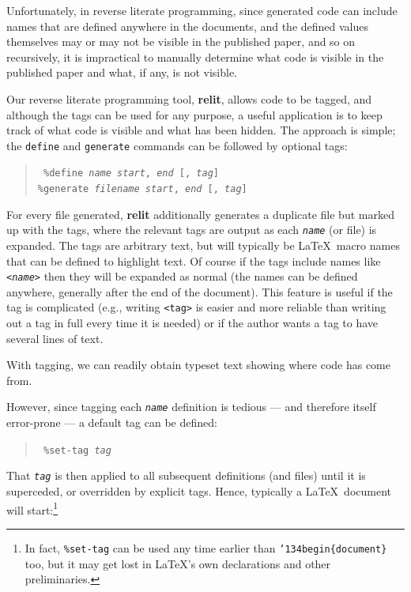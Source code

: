 \documentclass[12pt]{article}
\def\name#1{\textbf{#1}}
\begin{document}
Unfortunately, in reverse literate programming, since generated code can include names that are defined anywhere in the documents, and the defined values themselves may or may not be visible in the published paper, and so on recursively, it is impractical to manually determine what code is visible in the published paper and what, if any, is not visible.

Our reverse literate programming tool, \name{relit}, allows code to be tagged, and although the tags can be used for any purpose, a useful application is to keep track of what code is visible and what has been hidden. The approach is simple; the \texttt{define} and \texttt{generate} commands can be followed by optional tags:

\begin{verse}\tt
\%{}define \emph{name} \emph{start}, \emph{end} [, \emph{tag}] \\
\%{}generate \emph{filename} \emph{start}, \emph{end} [, \emph{tag}]
\end{verse} 

For every file generated, \name{relit} additionally generates a duplicate file but marked up with the tags, where the relevant tags are output as each \texttt{\emph{name}} (or file) is expanded. The tags are arbitrary text, but will typically be \LaTeX\ macro names that can be defined to highlight text. Of course if the tags include names like \texttt{<\emph{name}>} then they will be expanded as normal (the names can be defined anywhere, generally after the end of the document). This feature is useful if the tag is complicated (e.g., writing \texttt{<tag>} is easier and more reliable than writing out a tag in full every time it is needed) or if the author wants a tag to have several lines of text.

With tagging, we can readily obtain typeset text showing where code has come from. 

However, since tagging each \texttt{\emph{name}} definition is tedious --- and therefore itself error-prone --- a default tag can be defined:

\begin{verse}\tt
\%{}set-tag \emph{tag} \\
\end{verse}

That \texttt{\emph{tag}} is then applied to all subsequent definitions (and files) until it is superceded, or overridden by explicit tags. Hence, typically a \LaTeX\ document will start:\footnote{In fact, \texttt{\%{}set-tag} can be used any time earlier than \texttt{\char'134begin\{document\}} too, but it may get lost in \LaTeX's own declarations and other preliminaries.}
\end{document}
